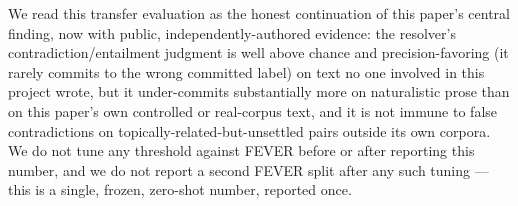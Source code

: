 We read this transfer evaluation as the honest continuation of this
paper's central finding, now with public, independently-authored
evidence: the resolver's contradiction/entailment judgment is well above
chance and precision-favoring (it rarely commits to the wrong committed
label) on text no one involved in this project wrote, but it
under-commits substantially more on naturalistic prose than on this
paper's own controlled or real-corpus text, and it is not immune to
false contradictions on topically-related-but-unsettled pairs outside
its own corpora. We do not tune any threshold against FEVER before or
after reporting this number, and we do not report a second FEVER split
after any such tuning --- this is a single, frozen, zero-shot number,
reported once.

